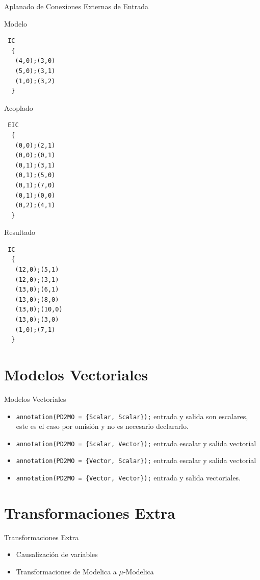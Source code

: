 \documentclass{beamer}
\begin{document}
\begin{frame}[fragile]{Aplanado de Conexiones Externas de Entrada}
\begin{minipage}[t]{0.3\linewidth}
Modelo
\begin{verbatim}
 IC
  {
   (4,0);(3,0)
   (5,0);(3,1)
   (1,0);(3,2)
  }
\end{verbatim}
\end{minipage}
\begin{minipage}[t]{0.3\linewidth}
Acoplado
\begin{verbatim}
 EIC
  {
   (0,0);(2,1)
   (0,0);(0,1)
   (0,1);(3,1)
   (0,1);(5,0)
   (0,1);(7,0)
   (0,1);(0,0)
   (0,2);(4,1)
  }
\end{verbatim}
\end{minipage}
\begin{minipage}[t]{0.3\linewidth}
Resultado
\begin{verbatim}
 IC
  {
   (12,0);(5,1)
   (12,0);(3,1)
   (13,0);(6,1)
   (13,0);(8,0)
   (13,0);(10,0)
   (13,0);(3,0)
   (1,0);(7,1)
  }
\end{verbatim}
\end{minipage}
\end{frame}

\section{Modelos Vectoriales}
\begin{frame}{Modelos Vectoriales}
\begin{itemize}
	\item<1-> \texttt{annotation(PD2MO = \{Scalar, Scalar\});} entrada y salida son escalares, este es el caso por omisión y no es necesario declararlo.
	\item<2-> \texttt{annotation(PD2MO = \{Scalar, Vector\});} entrada escalar y salida vectorial
	\item<3-> \texttt{annotation(PD2MO = \{Vector, Scalar\});} entrada escalar y salida vectorial
	\item<4-> \texttt{annotation(PD2MO = \{Vector, Vector\});} entrada y salida vectoriales.
\end{itemize}
\end{frame}


\section{Transformaciones Extra}
\begin{frame}{Transformaciones Extra}
	\begin{itemize}
	\item<1-> Causalización de variables
	\item<2-> Transformaciones de Modelica a $\mu$-Modelica
	\end{itemize}
\end{frame}
\end{document}
